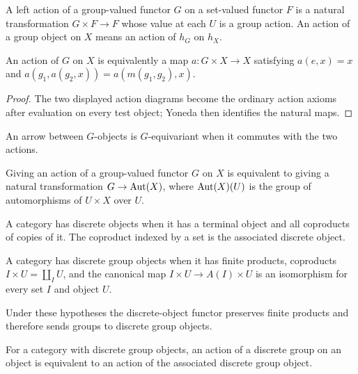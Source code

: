 \begin{definition}[action]\label{fga-def-2-15}
A left action of a group-valued functor $G$ on a set-valued functor $F$ is a
natural transformation $G\times F\to F$ whose value at each $U$ is a group
action.  An action of a group object on $X$ means an action of $h_G$ on $h_X$.
\end{definition}
\begin{proposition}\label{fga-prop-2-16}
An action of $G$ on $X$ is equivalently a map $a:G\times X\to X$ satisfying
$a(e,x)=x$ and $a(g_1,a(g_2,x))=a(m(g_1,g_2),x)$.
\end{proposition}
\begin{proof}
The two displayed action diagrams become the ordinary action axioms after
evaluation on every test object; Yoneda then identifies the natural maps.
\end{proof}

\begin{definition}\label{fga-def-2-17}
An arrow between $G$-objects is $G$-equivariant when it commutes with the two
actions.
\end{definition}
\begin{proposition}\label{fga-prop-2-18}
Giving an action of a group-valued functor $G$ on $X$ is equivalent to giving a
natural transformation $G\to\operatorname{Aut}(X)$, where $\operatorname{Aut}(X)(U)$ is the group of
automorphisms of $U\times X$ over $U$.
\end{proposition}

\begin{definition}\label{fga-def-2-19}\uses{}
A category has discrete objects when it has a terminal object and all coproducts
of copies of it.  The coproduct indexed by a set is the associated discrete
object.
\end{definition}\begin{definition}\label{fga-def-2-20}
A category has discrete group objects when it has finite products, coproducts
$I\times U=\coprod_I U$, and the canonical map $I\times U\to A(I)\times U$
is an isomorphism for every set $I$ and object $U$.
\end{definition}
\begin{proposition}\label{fga-prop-2-21}
Under these hypotheses the discrete-object functor preserves finite products and
therefore sends groups to discrete group objects.
\end{proposition}
\begin{proposition}\label{fga-prop-2-22}
For a category with discrete group objects, an action of a discrete group on an
object is equivalent to an action of the associated discrete group object.
\end{proposition}

